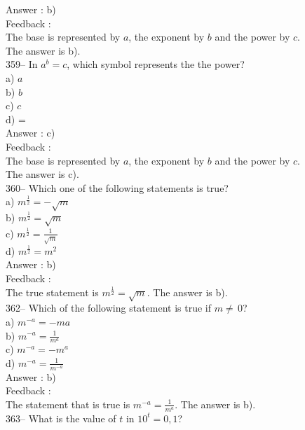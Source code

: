 \documentclass[letterpaper, 12pt]{article}
\begin{document}
Answer : b)\\

Feedback : \\
The base is represented by $a$, the exponent by $b$ and the power by $c$.\\
The answer is b).\\

359-- In $a^{b}=c$, which symbol represents the the power?\\
a) $a$\\
b) $b$\\
c) $c$\\
d) =\\

Answer : c)\\

Feedback : \\
The base is represented by $a$, the exponent by $b$ and the power by $c$.\\
The answer is c).\\

360-- Which one of the following statements is true?\\
a) $m^{\frac{1}{2}}=-\sqrt{m}$\\
b) $m^{\frac{1}{2}}=\sqrt{m}$\\
c) $m^{\frac{1}{2}}=\frac{1}{\sqrt{m}}$\\
d) $m^{\frac{1}{2}}=m^{2}$\\

Answer : b)\\

Feedback : \\
The true statement is $m^{\frac{1}{2}}=\sqrt{m}$.  The answer is b).\\


362-- Which of the following statement is true if $m\neq\,$0?\\
a) $m^{-a}=-ma$\\[2mm]
b) $m^{-a}=\frac{1}{m^{a}}$\\[2mm]
c) $m^{-a}=-m^{a}$\\[2mm]
d) $m^{-a}=\frac{1}{m^{-a}}$\\

Answer : b)\\

Feedback : \\
The statement that is true is $m^{-a}=\frac{1}{m^{a}}$.  The answer is
b).\\

363-- What is the value of $t$ in $10^{t}=0,1$?\\
\end{document}
